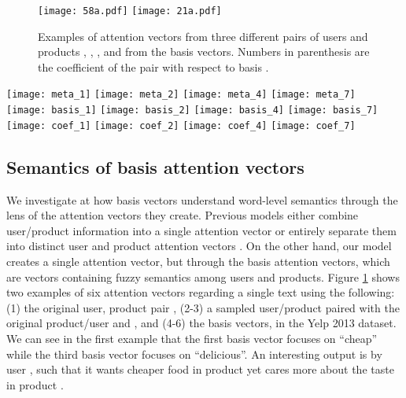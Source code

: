 \documentclass[11pt,a4paper]{article}
\begin{document}
\begin{figure}
    \centering
    \texttt{[image: 58a.pdf]}
    \texttt{[image: 21a.pdf]}
    \caption{Examples of attention vectors from three different pairs of users and products , , , and from the basis vectors. Numbers in parenthesis are the  coefficient of the pair  with respect to basis .}\label{fig:basisvecs}
\end{figure}

\begin{figure*}[t]
    \centering
    \texttt{[image: meta\_1]}
    \texttt{[image: meta\_2]}
    \texttt{[image: meta\_4]}
    \texttt{[image: meta\_7]}
    ~
    \texttt{[image: basis\_1]}
    \texttt{[image: basis\_2]}
    \texttt{[image: basis\_4]}
    \texttt{[image: basis\_7]}
    ~
    \texttt{[image: coef\_1]}
    \texttt{[image: coef\_2]}
    \texttt{[image: coef\_4]}
    \texttt{[image: coef\_7]}
    \caption{TSNE Visualization of the category vectors of Customized \mbox{BiLSTM} (first row) and Basis-Customized \mbox{BiLSTM} (middle row), and the  coefficients of the latter model (last row), when epoch is equal to 1, 2, 4, and when training has finished (left to right).}
    \label{fig:vectorlearn}
\end{figure*}

\subsection{Semantics of basis attention vectors}

We investigate at how basis vectors understand word-level semantics through the lens of the attention vectors they create. Previous models either combine user/product information into a single attention vector \cite{chen2016neural} or entirely separate them into distinct user and product attention vectors \cite{amplayo2018cold}. On the other hand, our model creates a single attention vector, but through the  basis attention vectors, which are vectors containing fuzzy semantics among users and products. Figure \ref{fig:basisvecs} shows two examples of six attention vectors regarding a single text using the following: (1) the original user, product pair , (2-3) a sampled user/product paired with the original product/user  and , and (4-6) the basis vectors, in the Yelp 2013 dataset. We can see in the first example that the first basis vector focuses on ``cheap'' while the third basis vector focuses on ``delicious''. An interesting output is by user , such that it wants cheaper food in product  yet cares more about the taste in product .
\end{document}

